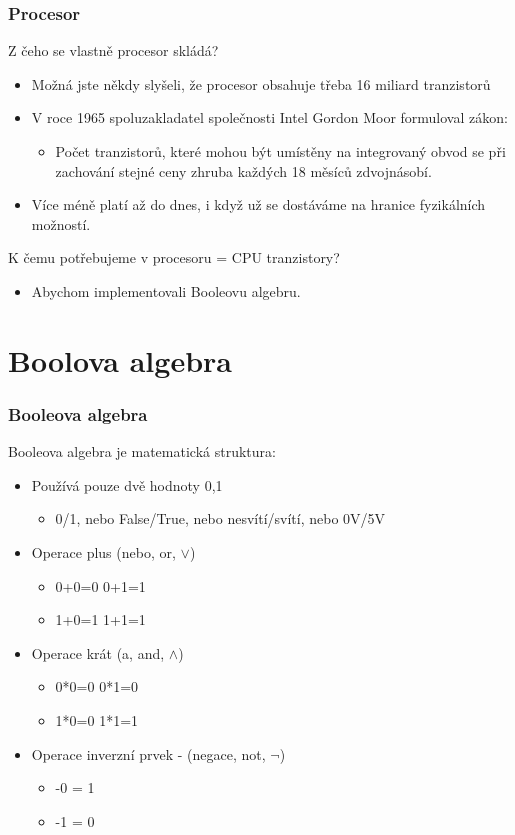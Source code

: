 \documentclass{beamer}
\begin{document}
\begin{frame}
\frametitle{Procesor}

Z čeho se vlastně procesor skládá?
\begin{itemize}
\item Možná jste někdy slyšeli, že procesor obsahuje třeba 16 miliard tranzistorů
\item V roce 1965 spoluzakladatel společnosti Intel Gordon Moor formuloval zákon: 
\begin{itemize}
\item Počet tranzistorů, které mohou být umístěny na integrovaný obvod se při zachování stejné ceny zhruba každých 18 měsíců zdvojnásobí.
\end{itemize}
\item Více méně platí až do dnes, i když už se dostáváme na hranice fyzikálních možností.
\end{itemize}

K čemu potřebujeme v procesoru = CPU tranzistory?
\begin{itemize}
\item Abychom implementovali Booleovu algebru.
\end{itemize}
\end{frame}



\section{Boolova algebra}



\begin{frame}
\frametitle{Booleova algebra}

Booleova algebra je matematická struktura:
\begin{itemize}
\item Používá pouze dvě hodnoty 0,1
\begin{itemize}
\item 0/1, nebo False/True, nebo nesvítí/svítí, nebo 0V/5V
\end{itemize}
\item Operace plus (nebo, or, $\lor$)
\begin{itemize}
\item 0+0=0 \phantom{XXXX}  0+1=1
\item 1+0=1 \phantom{XXXX}  1+1=1
\end{itemize}
\item Operace krát (a, and, $\land$)
\begin{itemize}
\item 0*0=0 \phantom{XXXX}  0*1=0
\item 1*0=0 \phantom{XXXX}  1*1=1
\end{itemize}
\item Operace inverzní prvek - (negace, not, $\neg$)
\begin{itemize}
\item -0 = 1
\item -1 = 0
\end{itemize}
\end{itemize}
\end{frame}
\end{document}
